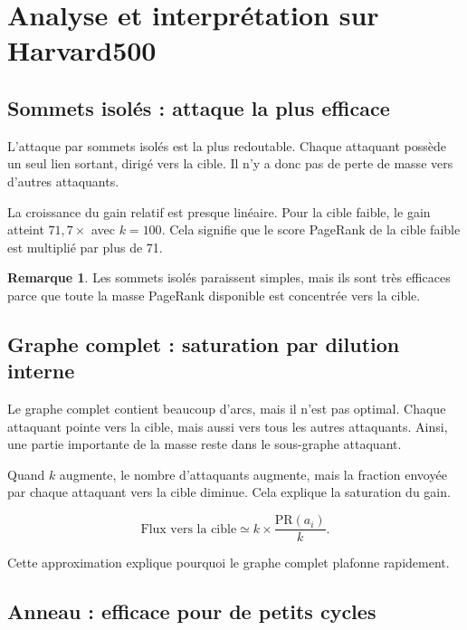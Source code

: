 \documentclass[12pt,a4paper]{article}
\newcommand{\PR}{\mathrm{PR}}
\theoremstyle{definition}
\newtheorem{remarque}{Remarque}[section]
\begin{document}
\section{Analyse et interprétation sur Harvard500}

\subsection{Sommets isolés : attaque la plus efficace}

L'attaque par sommets isolés est la plus redoutable. Chaque attaquant possède un
seul lien sortant, dirigé vers la cible. Il n'y a donc pas de perte de masse
vers d'autres attaquants.

La croissance du gain relatif est presque linéaire. Pour la cible faible, le
gain atteint $71{,}7\times$ avec $k=100$. Cela signifie que le score PageRank de
la cible faible est multiplié par plus de 71.

\begin{remarque}
Les sommets isolés paraissent simples, mais ils sont très efficaces parce que
toute la masse PageRank disponible est concentrée vers la cible.
\end{remarque}

\subsection{Graphe complet : saturation par dilution interne}

Le graphe complet contient beaucoup d'arcs, mais il n'est pas optimal. Chaque
attaquant pointe vers la cible, mais aussi vers tous les autres attaquants.
Ainsi, une partie importante de la masse reste dans le sous-graphe attaquant.

Quand $k$ augmente, le nombre d'attaquants augmente, mais la fraction envoyée
par chaque attaquant vers la cible diminue. Cela explique la saturation du gain.

\[
\text{Flux vers la cible}
\simeq
k \times \frac{\PR(a_i)}{k}.
\]

Cette approximation explique pourquoi le graphe complet plafonne rapidement.

\subsection{Anneau : efficace pour de petits cycles}
\end{document}
